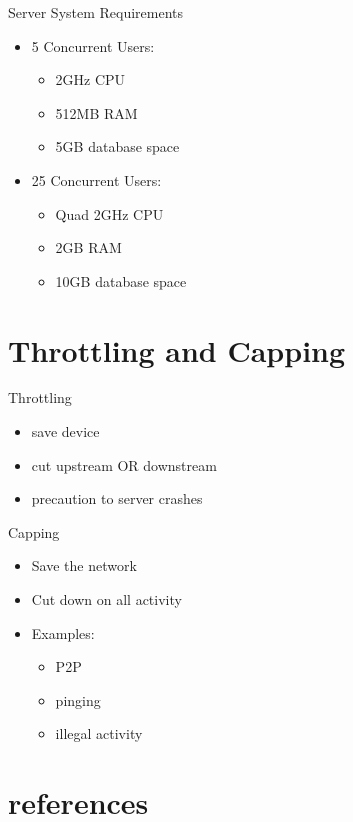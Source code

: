 \documentclass[arial,pdftex]{beamer}
\begin{document}
\begin{frame}{Server System Requirements}
  \begin{itemize}
  \item 5 Concurrent Users:
    \begin{itemize}
    \item 2GHz CPU
    \item 512MB RAM
    \item 5GB database space
    \end{itemize}
    \pause
  \item 25 Concurrent Users:
    \begin{itemize}
    \item Quad 2GHz CPU
    \item 2GB RAM
    \item 10GB database space
    \end{itemize}
  \end{itemize}
\end{frame}

\section{Throttling and Capping}
\begin{frame}{Throttling}
  \begin{itemize}
  \item save device
  \item cut upstream OR downstream
  \item precaution to server crashes
  \end{itemize}
\end{frame}

\begin{frame}{Capping}
  \begin{itemize}
  \item Save the network
  \item Cut down on all activity
  \item Examples:
    \begin{itemize}
    \item P2P
    \item pinging
    \item illegal activity
    \end{itemize}
  \end{itemize}
\end{frame}

\section{references}
\end{document}
